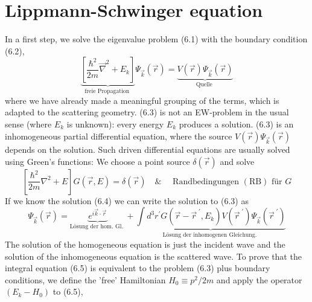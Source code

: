 \section{Lippmann-Schwinger equation}
In a first step, we solve the eigenvalue problem (6.1) with the boundary condition (6.2),
\begin{equation}
    \underbrace{\left[\frac{\hbar^{2}}{2 m} \vec{\nabla}^{2}+E_{k}\right]}_{\text {freie Propagation }} \Psi_{\vec{k}}(\vec{r})=\underbrace{V(\vec{r}) \Psi_{\vec{k}}(\vec{r})}_{\text {Quelle }}
    \end{equation}
where we have already made a meaningful grouping of the terms, which is adapted to the scattering geometry. (6.3) is not an EW-problem in the usual sense (where $E_k$ is unknown): every energy $E_k$ produces a solution. (6.3) is an inhomogeneous partial differential equation, where the source $V(\vec{r})\Psi_{\vec{k}}(\vec{r})$ depends on the solution. Such driven differential equations are usually solved using Green's functions: We choose a point source $\delta(\vec{r})$ and solve
\begin{equation}
    \left[\frac{\hbar^{2}}{2 m} \nabla^{2}+E\right] G(\vec{r}, E)=\delta(\vec{r}) \quad \& \quad \text { Randbedingungen }(\mathrm{RB}) \text { für } G
    \end{equation}
If we know the solution (6.4) we can write the solution to (6.3) as
\begin{equation}
    \Psi_{\vec{k}}(\vec{r})=\underbrace{e^{i \vec{k} \cdot \vec{r}}}_{\text {Lösung der hom. Gl. }}+\underbrace{\int d^{3} r^{\prime} G\left(\vec{r}-\vec{r}^{\;\prime}, E_{k}\right) V\left(\vec{r}^{\;\prime}\right) \Psi_{\vec{k}}\left(\vec{r}^{\;\prime}\right)}_{\text {Lösung der inhomogenen Gleichung. }}
    \end{equation}
The solution of the homogeneous equation is just the incident wave and the solution of the inhomogeneous equation is the scattered wave. To prove that the integral equation (6.5) is equivalent to the problem (6.3) plus boundary conditions, we define the 'free' Hamiltonian $H_0 \equiv p^2 / 2m$ and apply the operator $(E_k - H_0)$ to (6.5),

